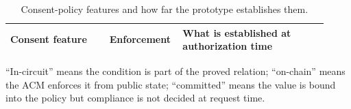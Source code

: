 \begin{table}[htbp]
  \centering\footnotesize
  \caption{Consent-policy features and how far the prototype establishes them.}
  \label{tab:policy-support}
  \setlength{\tabcolsep}{4pt}
  \begin{tabular}{p{0.30\linewidth}p{0.18\linewidth}p{0.44\linewidth}}
    \toprule
    Consent feature & Enforcement & What is established at authorization time \\
    \midrule
    
  \end{tabular}

  \begin{tablenote}
    ``In-circuit'' means the condition is part of the proved relation; ``on-chain''
    means the ACM enforces it from public state; ``committed'' means the value is
    bound into the policy but compliance is not decided at request time.
  \end{tablenote}
\end{table}
